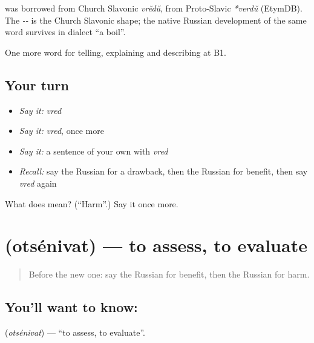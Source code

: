 \begin{cousinweb}
\textbf{} was borrowed from Church Slavonic \emph{vrědŭ}, from Proto-Slavic \emph{*verdŭ} (EtymDB). The \emph{--} is the Church Slavonic shape; the native Russian development of the same word survives in dialect \emph{} \textquotedblleft{}a boil\textquotedblright{}.
\end{cousinweb}

\begin{grammarlens}[title={What you've built}]
One more word for telling, explaining and describing at B1.
\end{grammarlens}

\subsection*{Your turn}
\begin{itemize}
\raggedright
  \item \emph{Say it:} \emph{vred}
  \item \emph{Say it:} \emph{vred}, once more
  \item \emph{Say it:} a sentence of your own with \emph{vred}
  \item \emph{Recall:} say the Russian for a drawback, then the Russian for benefit, then say \emph{vred} again
\end{itemize}

\begin{tcolorbox}[breakable,colback=teal!4,colframe=teal!35!black,title={Before you move on}]
What does  mean? (\textquotedblleft{}Harm\textquotedblright{}.) Say it once more.
\end{tcolorbox}
\section[\texorpdfstring{\ru{оценивать} (otsénivat)}{оценивать (otsénivat)}]{ (otsénivat) — to assess, to evaluate}

\label{lesson:RU-C346-ocenivat}



\begin{quote}
Before the new one: say the Russian for benefit, then the Russian for harm.
\end{quote}

\subsection*{You'll want to know: }
\textbf{} (\emph{otsénivat}) — \textquotedblleft{}to assess, to evaluate\textquotedblright{}.


